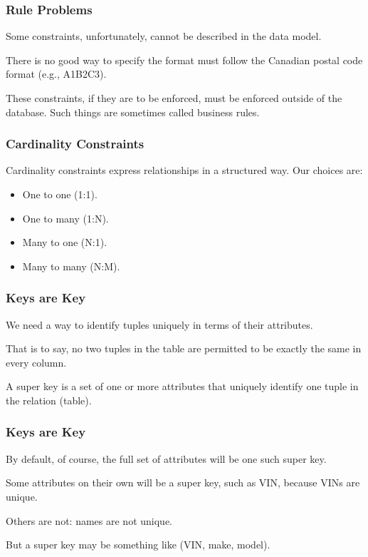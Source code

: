 \begin{frame}
\frametitle{Rule Problems}

Some constraints, unfortunately, cannot be described in the data model. 

There is no good way to specify the format must follow the Canadian postal code format (e.g., A1B2C3). 

These constraints, if they are to be enforced, must be enforced outside of the database. Such things are sometimes called business rules.


\end{frame}




\begin{frame}
\frametitle{Cardinality Constraints}

Cardinality constraints express relationships in a structured way. Our choices are:

\begin{itemize}
\item One to one (1:1).
\item One to many (1:N).
\item Many to one (N:1).
\item Many to many (N:M).
\end{itemize}

\end{frame}



\begin{frame}
\frametitle{Keys are Key}

We need a way to identify tuples uniquely in terms of their attributes. 

That is to say, no two tuples in the table are permitted to be exactly the same in every column. 

A \alert{super key} is a set of one or more attributes that uniquely identify one tuple in the relation (table).

\end{frame}

\begin{frame}
\frametitle{Keys are Key}

By default, of course, the full set of attributes will be one such super key. 

Some attributes on their own will be a super key, such as VIN, because VINs are unique.

Others are not: names are not unique. 

But a super key may be something like (VIN, make, model). 

\end{frame}



